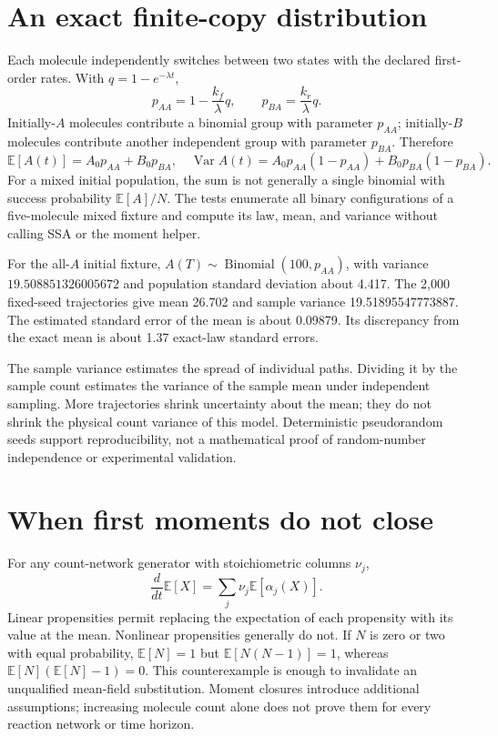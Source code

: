 \section{An exact finite-copy distribution}
Each molecule independently switches between two states with the declared
first-order rates. With $q=1-e^{-\lambda t}$,
\[
p_{AA}=1-\frac{k_f}{\lambda}q,\qquad
p_{BA}=\frac{k_r}{\lambda}q.
\]
Initially-$A$ molecules contribute a binomial group with parameter $p_{AA}$;
initially-$B$ molecules contribute another independent group with parameter $p_{BA}$.
Therefore
\[
\mathbb E[A(t)]=A_0p_{AA}+B_0p_{BA},
\quad
\operatorname{Var}A(t)=A_0p_{AA}(1-p_{AA})+B_0p_{BA}(1-p_{BA}).
\]
For a mixed initial population, the sum is not generally a single binomial with
success probability $\mathbb E[A]/N$. The tests enumerate all binary configurations
of a five-molecule mixed fixture and compute its law, mean, and variance without
calling SSA or the moment helper.

For the all-$A$ initial fixture, $A(T)\sim\operatorname{Binomial}(100,p_{AA})$,
with variance $19.508851326005672$ and population standard deviation about 4.417.
The 2,000 fixed-seed trajectories give mean 26.702 and sample variance
19.51895547773887. The estimated standard error of the mean is about 0.09879.
Its discrepancy from the exact mean is about 1.37 exact-law standard errors.

The sample variance estimates the spread of individual paths. Dividing it by the
sample count estimates the variance of the sample mean under independent sampling.
More trajectories shrink uncertainty about the mean; they do not shrink the
physical count variance of this model. Deterministic pseudorandom seeds support
reproducibility, not a mathematical proof of random-number independence or
experimental validation.

\section{When first moments do not close}
For any count-network generator with stoichiometric columns $\nu_j$,
\[
\frac{d}{dt}\mathbb E[X]=\sum_j\nu_j\mathbb E[\alpha_j(X)].
\]
Linear propensities permit replacing the expectation of each propensity with its
value at the mean. Nonlinear propensities generally do not. If $N$ is zero or two
with equal probability, $\mathbb E[N]=1$ but
$\mathbb E[N(N-1)]=1$, whereas $\mathbb E[N](\mathbb E[N]-1)=0$.
This counterexample is enough to invalidate an unqualified mean-field substitution.
Moment closures introduce additional assumptions; increasing molecule count alone
does not prove them for every reaction network or time horizon.

